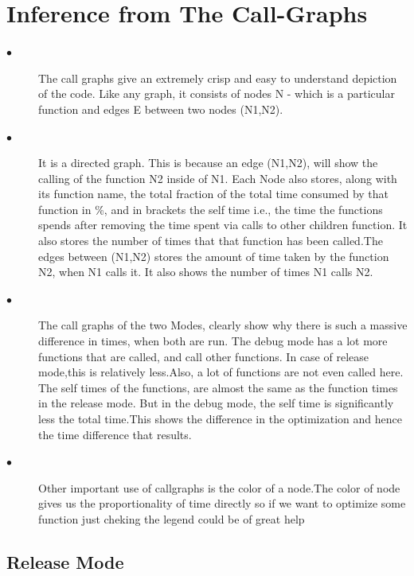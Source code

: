 \documentclass[11pt]{article}
\begin{document}
\section*{Inference from The Call-Graphs}
\begin{description}
\item[$\bullet$ ]
The call graphs give an extremely crisp and easy to understand depiction of the code. Like any graph, it consists of nodes N - which is a particular function and edges E between two nodes (N1,N2). 
\newline
\item[$\bullet$ ]
It is a directed graph. This is because an edge (N1,N2), will show the calling of the function N2 inside of N1. Each Node also stores, along with its function name, the total fraction of the total time consumed by that function in \%, and in brackets the self time i.e., the time the functions spends after removing the time spent via calls to other children function. It also stores the number of times that that function has been called.The edges between (N1,N2) stores the amount of time taken by the function N2, when N1 calls it. It also shows the number of times N1 calls N2.\newline
\item[$\bullet$ ]
The call graphs of the two Modes, clearly show why there is such a massive difference in times, when both are run. The debug mode has a lot more functions that are called, and call other functions. In case of release mode,this is relatively less.Also, a lot of functions are not even called here. The self times of the functions, are almost the same as the function times in the release mode. But in the debug mode, the self time is significantly less the total time.This shows the difference in the optimization and hence the time difference that results.
\newline
\item[$\bullet$ ]
Other important use of callgraphs is the color of a node.The color of node gives us the proportionality of time directly so if we want to optimize some function just cheking the legend could be of great help
\end{description}
\subsection*{Release Mode}
\end{document}
